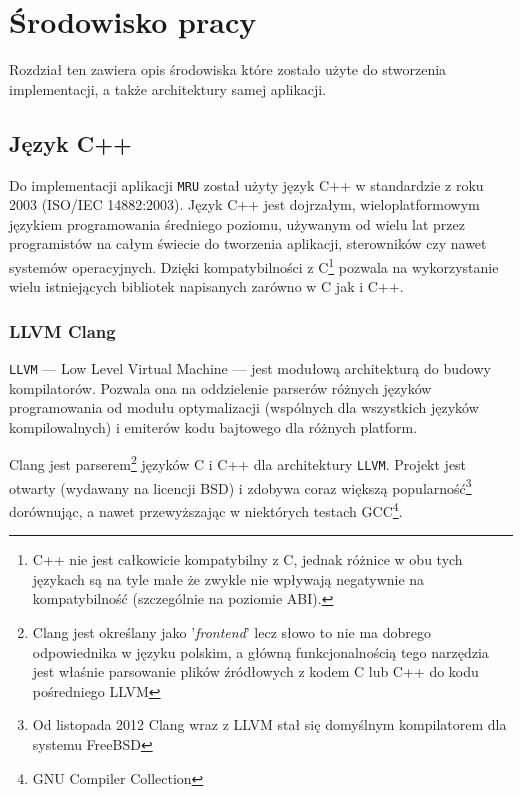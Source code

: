 \chapter{Środowisko pracy}
\label{srodowisko}
\par
Rozdział ten zawiera opis środowiska które zostało użyte do stworzenia implementacji, a także architektury samej aplikacji.

\section{Język C++}
\par
Do implementacji aplikacji \texttt{MRU} został użyty język C++ w standardzie z roku 2003 (ISO/IEC 14882:2003).
Język C++ jest dojrzałym, wieloplatformowym językiem programowania średniego poziomu, używanym od wielu lat przez programistów na całym świecie do tworzenia aplikacji, sterowników czy nawet systemów operacyjnych. Dzięki kompatybilności z C\footnote{C++ nie jest całkowicie kompatybilny z  C, jednak różnice w obu tych językach są na tyle małe że zwykle nie wpływają negatywnie na kompatybilność (szczególnie na poziomie ABI).} pozwala na wykorzystanie wielu istniejących bibliotek napisanych zarówno w C jak i C++.

\subsection{LLVM Clang}
\par
\texttt{LLVM} --- Low Level Virtual Machine --- jest modułową architekturą do budowy kompilatorów. Pozwala ona na oddzielenie parserów różnych języków programowania od modułu optymalizacji (wspólnych dla wszystkich języków kompilowalnych) i emiterów kodu bajtowego dla różnych platform.

\par
Clang jest parserem\footnote{Clang jest określany jako '\textit{frontend}' lecz słowo to nie ma dobrego odpowiednika w języku polskim, a główną funkcjonalnością tego narzędzia jest właśnie parsowanie plików źródłowych z kodem C lub C++ do kodu pośredniego LLVM} języków C i C++ dla architektury \texttt{LLVM}. Projekt jest otwarty (wydawany na licencji BSD) i zdobywa coraz większą popularność\footnote{Od listopada 2012 Clang wraz z LLVM stał się domyślnym kompilatorem dla systemu FreeBSD} dorównując, a nawet przewyższając w niektórych testach GCC\footnote{GNU Compiler Collection}.

